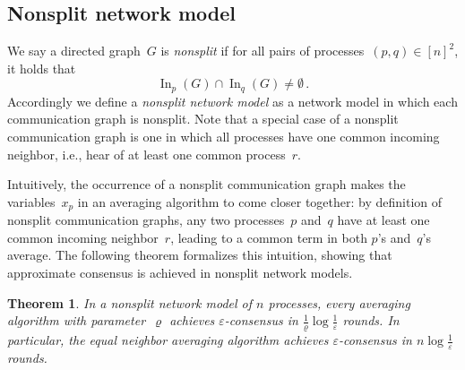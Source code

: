 \documentclass[a4paper]{article}
\theoremstyle{newthm}
\newtheorem{thm}{Theorem}
\DeclareMathOperator\In{In}
\begin{document}
	 
\subsection{Nonsplit network model}

We say a directed graph~$G$ is {\em nonsplit\/} if for all pairs of
     processes~$(p,q) \in [n]^2$, it holds that
     \begin{equation}
       \In_p(G)  \cap \In_q(G)  \neq \emptyset   \,.
     \end{equation}
Accordingly we define a {\em nonsplit network model\/} as a network model 
	in which each communication graph is nonsplit.
Note that a special case of a nonsplit communication graph is one in
     which all processes have one common incoming neighbor, i.e.,
     hear of at least one common process~$r$.

Intuitively, the occurrence of a nonsplit communication graph makes
	 the variables~$x_p$   in an averaging algorithm to come closer  
	 together: by definition of nonsplit communication graphs, any two 
	 processes~$p$ and~$q$ have at least one common incoming neighbor~$r$, 
	 leading to a common term in both $p$'s and~$q$'s average.
The following theorem  formalizes this intuition, showing
     that approximate consensus is achieved in nonsplit network models.  

\begin{thm}\label{thm:nonsplit}
In a nonsplit network model of $n$ processes, every averaging algorithm with parameter~$\varrho$
	achieves $\varepsilon$-consensus in 
	$  \frac{1 }{\varrho} \log  \frac{1}{\varepsilon} $ rounds.
In particular, the equal neighbor averaging algorithm achieves $\varepsilon$-consensus in 
	$n \log \frac{1}{\varepsilon} $ rounds. 
\end{thm}
\end{document}
